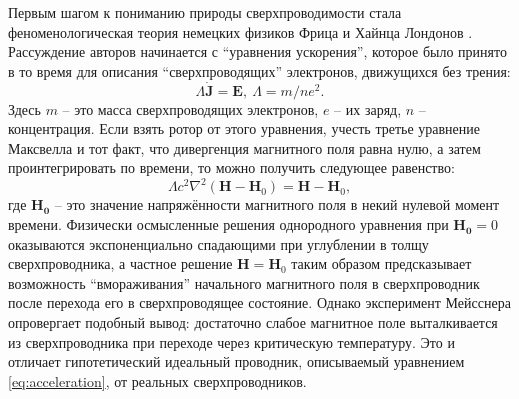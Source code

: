 \documentclass[14pt, a4paper]{extreport}
\numberwithin{equation}{section}
\begin{document}
Первым шагом к пониманию природы сверхпроводимости стала феноменологическая теория немецких физиков Фрица и Хайнца Лондонов \cite{london1935electromagnetic}. Рассуждение авторов начинается с ``уравнения ускорения'', которое было принято в то время для описания ``сверхпроводящих'' электронов, движущихся без трения:
\begin{equation}
	\Lambda \dot{\mathbf{J}} = \mathbf{E},\ \Lambda = m/ne^2. \label{eq:acceleration}
\end{equation}
Здесь $m$ -- это масса сверхпроводящих электронов, $e$ -- их заряд, $n$ -- концентрация. Если взять ротор от этого уравнения, учесть третье уравнение Максвелла и тот факт, что дивергенция магнитного поля равна нулю, а затем проинтегрировать по времени, то можно получить следующее равенство:
\begin{equation}
	\Lambda c^2 \nabla^2 (\mathbf{H}-\mathbf{H}_0) = \mathbf{H} - \mathbf{H}_0,\label{eq:london_inhomogeneous}
\end{equation}
где $\mathbf{H_0}$ -- это значение напряжённости магнитного поля в некий нулевой момент времени. Физически осмысленные решения однородного уравнения при $\mathbf{H_0} = 0$ оказываются экспоненциально спадающими при углублении в толщу сверхпроводника, а частное решение $\mathbf{H} = \mathbf{H}_0$ таким образом предсказывает возможность ``вмораживания'' начального магнитного поля в сверхпроводник после перехода его в сверхпроводящее состояние. Однако эксперимент Мейсснера опровергает подобный вывод: достаточно слабое магнитное поле выталкивается из сверхпроводника при переходе через критическую температуру. Это и отличает гипотетический идеальный проводник, описываемый уравнением \eqref{eq:acceleration}, от реальных сверхпроводников.
\end{document}

